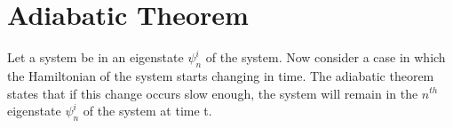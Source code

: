 \documentclass{article}
\begin{document}
 \section*{\LARGE{Adiabatic Theorem}}
 \begin{Large}
  Let a system be in an eigenstate $\psi_n^i$ of the system. Now consider a case in which the Hamiltonian of the system starts changing in time. The adiabatic theorem states that if this change occurs slow enough, the system will remain in the $n^{th}$ eigenstate $\psi_n^i$ of the system at time t.
 \end{Large}
\end{document}
